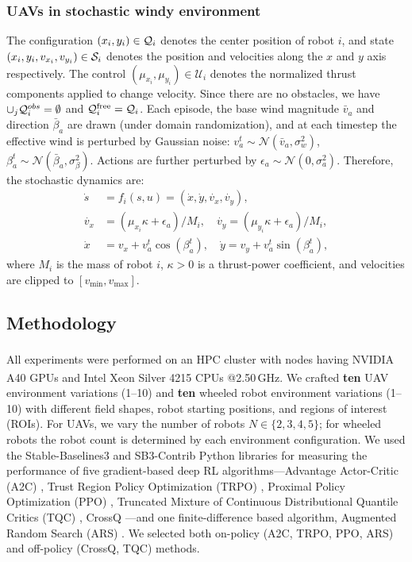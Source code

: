 \documentclass{article}
\begin{document}
\subsubsection{UAVs in stochastic windy environment} The configuration $(x_i, y_i) \in \mathcal{Q}_i$ denotes the center position of robot $i$, and state $(x_i, y_i, v_{x_i}, v_{y_i}) \in \mathcal{S}_i$ denotes the position and velocities along the $x$ and $y$ axis respectively. The control $(\mu_{x_i}, \mu_{y_i}) \in \mathcal{U}_i$ denotes the normalized thrust components applied to change velocity. Since there are no obstacles, we have $\cup_j \mathcal{Q}_i^{obs} = \emptyset$ and $\mathcal{Q}_i^{\mathrm{free}} = \mathcal{Q}_i$. Each episode, the base wind magnitude $\bar{v}_a$ and direction $\bar{\beta}_a$ are drawn (under domain randomization), and at each timestep the effective wind is perturbed by Gaussian noise: $v_a^t \sim \mathcal{N}(\bar{v}_a, \sigma_w^2)$, $\beta_a^t \sim \mathcal{N}(\bar{\beta}_a, \sigma_\beta^2)$. Actions are further perturbed by $\epsilon_a \sim \mathcal{N}(0, \sigma_a^2)$. Therefore, the stochastic dynamics are:
\begin{align}
\dot{s} &= f_i(s,u) = (\dot{x}, \dot{y}, \dot{v_{x}}, \dot{v_{y}}),\\
\dot{v_x} &= (\mu_{x_i} \kappa + \epsilon_a) / M_i, \quad \dot{v_y} = (\mu_{y_i} \kappa + \epsilon_a) / M_i, \\
\dot{x} &= v_x + v_a^t \cos(\beta_a^t), \quad \dot{y} = v_y + v_a^t \sin(\beta_a^t),
\end{align}
where $M_i$ is the mass of robot $i$, $\kappa > 0$ is a thrust-power coefficient, and velocities are clipped to $[v_{\min}, v_{\max}]$.

\subsection{Methodology}
All experiments were performed on an HPC cluster with nodes having NVIDIA\textsuperscript{\textregistered} A40 GPUs and Intel\textsuperscript{\textregistered} Xeon\textsuperscript{\textregistered} Silver 4215 CPUs @2.50\,GHz. We crafted \textbf{ten} UAV environment variations (1–10) and \textbf{ten} wheeled robot environment variations (1–10) with different field shapes, robot starting positions, and regions of interest (ROIs). For UAVs, we vary the number of robots $N \in \{2, 3, 4, 5\}$; for wheeled robots the robot count is determined by each environment configuration. We used the Stable-Baselines3 and SB3-Contrib \cite{stable-baselines3} Python libraries for measuring the performance of five gradient-based deep RL algorithms—Advantage Actor-Critic (A2C) \cite{mnih2016a2c}, Trust Region Policy Optimization (TRPO) \cite{schulman2015trust}, Proximal Policy Optimization (PPO) \cite{schulman2017ppo}, Truncated Mixture of Continuous Distributional Quantile Critics (TQC) \cite{kuznetsov2020tqc}, CrossQ \cite{bhatt2024crossq}—and one finite-difference based algorithm, Augmented Random Search (ARS) \cite{mania2018ars}. We selected both on-policy (A2C, TRPO, PPO, ARS) and off-policy (CrossQ, TQC) methods.
\end{document}
